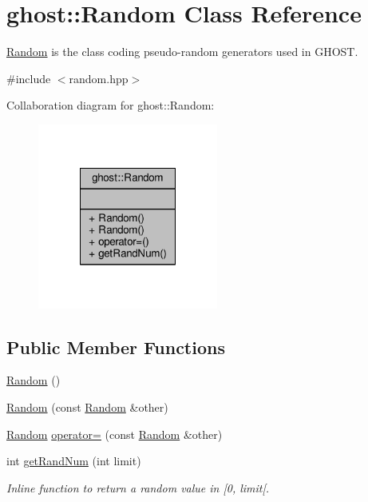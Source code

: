 \hypertarget{classghost_1_1Random}{\section{ghost\-:\-:Random Class Reference}
\label{classghost_1_1Random}
}


\hyperlink{classghost_1_1Random}{Random} is the class coding pseudo-\/random generators used in G\-H\-O\-S\-T.  




{\ttfamily \#include $<$random.\-hpp$>$}



Collaboration diagram for ghost\-:\-:Random\-:
\nopagebreak
\begin{figure}[H]
\begin{center}
\leavevmode
\includegraphics[width=168pt]{classghost_1_1Random__coll__graph}
\end{center}
\end{figure}
\subsection*{Public Member Functions}
\begin{DoxyCompactItemize}
\item 
\hyperlink{classghost_1_1Random_a7c45efd1f7c522a68760104ba6084d89}{Random} ()
\item 
\hyperlink{classghost_1_1Random_aa57a39ee45a9ba30d7f7ea2c4c17b539}{Random} (const \hyperlink{classghost_1_1Random}{Random} \&other)
\item 
\hyperlink{classghost_1_1Random}{Random} \hyperlink{classghost_1_1Random_a6e5cb2eeaee9846a1ca8fe1ee6749c00}{operator=} (const \hyperlink{classghost_1_1Random}{Random} \&other)
\item 
int \hyperlink{classghost_1_1Random_a26f7e445a05839bd89ca9c14f8b34fbc}{get\-Rand\-Num} (int limit)
\begin{DoxyCompactList}\small\item\em Inline function to return a random value in \mbox{[}0, limit\mbox{[}. \end{DoxyCompactList}\end{DoxyCompactItemize}


